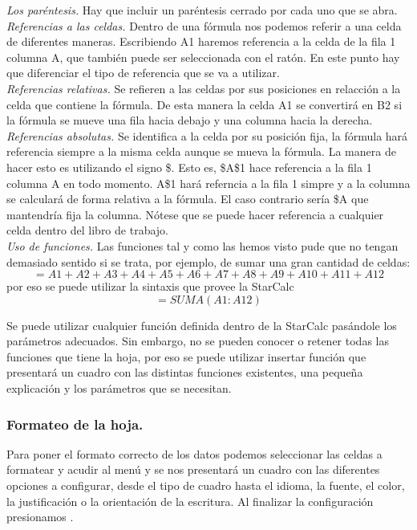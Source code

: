 \emph{Los paréntesis.} 
Hay que incluir un paréntesis cerrado por cada uno que
se abra.\\
\emph{Referencias a las celdas.}
Dentro de una fórmula nos podemos referir a una celda de diferentes maneras. 
Escribiendo A1 haremos referencia a la celda de la fila 1 columna A, que
también puede ser seleccionada con el ratón. 
En este punto hay que diferenciar el tipo de referencia que se va a utilizar.\\ 
\emph{Referencias relativas.}
Se refieren a las celdas por sus posiciones en relacción a la celda que
contiene la fórmula. De esta manera la celda A1 se convertirá en B2 si
la fórmula se mueve una fila hacia debajo y una columna hacia la derecha.\\ 
\emph{Referencias absolutas.} 
Se identifica a la celda por su posición fija, la fórmula hará referencia 
siempre a la misma celda aunque se mueva la fórmula. La manera de hacer esto 
es utilizando el signo \$. Esto es, \$A\$1 hace referencia a la fila 1
columna A  en todo momento. A\$1 hará referncia a la fila 1 simpre y a la
columna se calculará  de forma relativa a la fórmula. El caso contrario
sería \$A que mantendría fija  la columna.  Nótese que se puede hacer
referencia a cualquier celda dentro del libro de  trabajo.\\
 

\emph{Uso de funciones.}
Las funciones tal y como las hemos visto pude que no tengan demasiado sentido 
si se trata, por ejemplo, de sumar una gran cantidad de celdas:\\
\[=A1+A2+A3+A4+A5+A6+A7+A8+A9+A10+A11+A12\]
por eso se puede utilizar la sintaxis que provee la StarCalc\\
\[=SUMA(A1:A12)\]
 
Se puede utilizar cualquier función definida dentro de la StarCalc pasándole
los parámetros adecuados. Sin embargo, no se pueden conocer o retener todas 
las funciones que tiene la hoja, por eso se puede utilizar insertar función 
que presentará un cuadro con las distintas funciones existentes, una pequeña 
explicación y los parámetros que se necesitan. 


\subsubsection{Formateo de la hoja.} 
Para poner el formato correcto de los datos podemos seleccionar
las celdas a formatear y acudir al menú  
y se nos presentará un cuadro con las diferentes opciones a
configurar, desde el tipo de cuadro hasta el idioma, la fuente, el
color, la justificación o la orientación de la escritura. Al finalizar
la configuración presionamos .


